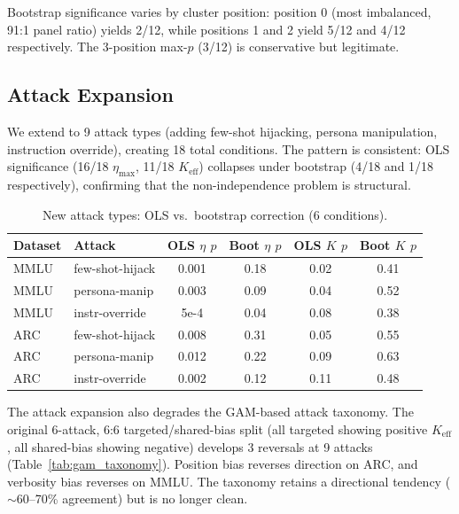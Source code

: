 \documentclass[11pt]{article}
\begin{document}
Bootstrap significance varies by cluster position: position 0 (most imbalanced, 91:1 panel ratio) yields 2/12, while positions 1 and 2 yield 5/12 and 4/12 respectively. The 3-position max-$p$ (3/12) is conservative but legitimate.

\subsection{Attack Expansion}
\label{sec:attack_expansion}

We extend to 9 attack types (adding few-shot hijacking, persona manipulation, instruction override), creating 18 total conditions. The pattern is consistent: OLS significance (16/18 $\eta_{\max}$, 11/18 $K_{\text{eff}}$) collapses under bootstrap (4/18 and 1/18 respectively), confirming that the non-independence problem is structural.

\begin{table}[h]
\centering
\caption{New attack types: OLS vs.\ bootstrap correction (6 conditions).}
\label{tab:new_attacks}
\small
\begin{tabular}{llcccc}
\toprule
Dataset & Attack & OLS $\eta$ $p$ & Boot $\eta$ $p$ & OLS $K$ $p$ & Boot $K$ $p$ \\
\midrule
MMLU & few-shot-hijack & 0.001 & 0.18 & 0.02 & 0.41 \\
MMLU & persona-manip & 0.003 & 0.09 & 0.04 & 0.52 \\
MMLU & instr-override & 5e-4 & 0.04 & 0.08 & 0.38 \\
ARC & few-shot-hijack & 0.008 & 0.31 & 0.05 & 0.55 \\
ARC & persona-manip & 0.012 & 0.22 & 0.09 & 0.63 \\
ARC & instr-override & 0.002 & 0.12 & 0.11 & 0.48 \\
\bottomrule
\end{tabular}
\end{table}

The attack expansion also degrades the GAM-based attack taxonomy. The original 6-attack, 6:6 targeted/shared-bias split (all targeted showing positive $K_{\text{eff}}$, all shared-bias showing negative) develops 3 reversals at 9 attacks (Table~\ref{tab:gam_taxonomy}). Position bias reverses direction on ARC, and verbosity bias reverses on MMLU. The taxonomy retains a directional tendency ($\sim$60--70\% agreement) but is no longer clean.
\end{document}
